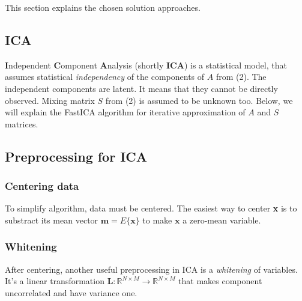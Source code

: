 \documentclass[../main.tex]{subfiles} %
\begin{document}
This section explains the chosen solution approaches.

\subsection{ICA}

\textbf{I}ndependent \textbf{C}omponent \textbf{A}nalysis  (shortly \textbf{ICA}) is a statistical model, that assumes statistical \textit{independency} of the components of $A$ from (2). The independent components are latent. It means that they cannot be directly observed. Mixing matrix $S$ from (2) is assumed to be unknown too. Below, we will explain the FastICA algorithm for iterative approximation of $A$ and $S$ matrices.

\subsection{Preprocessing for ICA}

\subsubsection{Centering data}
To simplify algorithm, data must be centered. The easiest way to center \textbf{x} is to substract its mean vector $\textbf{m} = E\{\textbf{x}\}$ to make $\textbf{x}$ a zero-mean variable.

\subsubsection{Whitening}
After centering, another useful preprocessing in ICA is a \textit{whitening} of variables. It's a linear transformation $\mathbf{L}: \mathbb{R}^{N \times M} \to \mathbb{R}^{N \times M}$ that makes component uncorrelated and have variance one.
\end{document}
